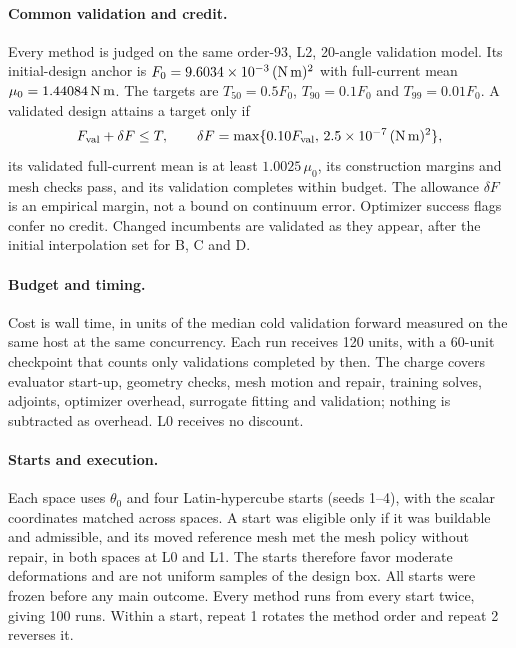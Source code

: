 \paragraph{Common validation and credit.}
Every method is judged on the same order-93, L2, 20-angle validation model.
Its initial-design anchor is $F_0=9.6034\times10^{-3}\,(\mathrm{N\,m})^2$ with
full-current mean $\mu_0=1.44084\,\mathrm{N\,m}$. The targets are $T_{50}=0.5F_0$,
$T_{90}=0.1F_0$ and $T_{99}=0.01F_0$. A validated design attains a target
only if
\begin{equation}
 F_{\mathrm{val}}+\delta F\leq T,\qquad
 \delta F=\max\{0.10F_{\mathrm{val}},\,2.5\times10^{-7}\,(\mathrm{N\,m})^2\},
\end{equation}
its validated full-current mean is at least $1.0025\,\mu_0$, its
construction margins and mesh checks pass, and its validation completes
within budget. The allowance $\delta F$ is an empirical margin, not a bound
on continuum error. Optimizer success flags confer no credit. Changed
incumbents are validated as they appear, after the initial interpolation
set for B, C and D.

\paragraph{Budget and timing.}
Cost is wall time, in units of the median cold validation forward measured
on the same host at the same concurrency. Each run receives 120 units,
with a 60-unit checkpoint that counts only validations completed by then.
The charge covers evaluator start-up, geometry checks, mesh motion and
repair, training solves, adjoints, optimizer overhead, surrogate fitting
and validation; nothing is subtracted as overhead. L0 receives no discount.

\paragraph{Starts and execution.}
Each space uses $\theta_0$ and four Latin-hypercube starts (seeds 1--4),
with the scalar coordinates matched across spaces. A start was eligible
only if it was buildable and admissible, and its moved reference mesh met
the mesh policy without repair, in both spaces at L0 and L1. The starts
therefore favor moderate deformations and are not uniform samples of the
design box. All starts were frozen before any main outcome. Every method
runs from every start twice, giving 100 runs. Within a start, repeat 1
rotates the method order and repeat 2 reverses it.

